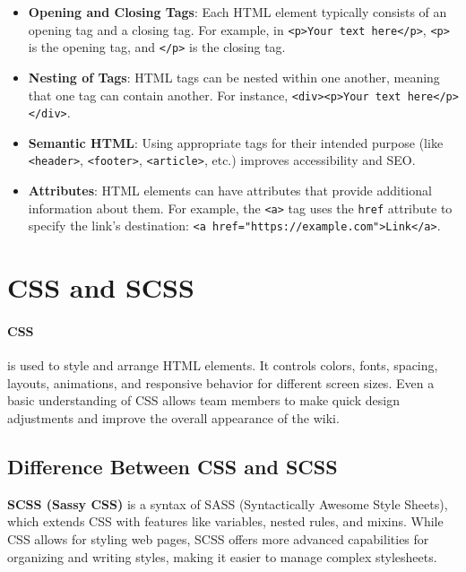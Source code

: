 \begin{itemize}
    \item \textbf{Opening and Closing Tags}: Each HTML element typically consists of an opening tag and a closing tag.
    For example, in \texttt{<p>Your text here</p>}, \texttt{<p>} is the opening tag, and \texttt{</p>} is the closing tag.

    \item \textbf{Nesting of Tags}: HTML tags can be nested within one another, meaning that one tag can contain another.
    For instance, \texttt{<div><p>Your text here</p></div>}.

    \item \textbf{Semantic HTML}: Using appropriate tags for their intended purpose (like \texttt{<header>}, \texttt{<footer>}, \texttt{<article>}, etc.) improves accessibility and SEO\@.

    \item \textbf{Attributes}: HTML elements can have attributes that provide additional information about them.
    For example, the \texttt{<a>} tag uses the \texttt{href} attribute to specify the link's destination:
    \verb|<a href="https://example.com">Link</a>|.
\end{itemize}


\section{CSS and SCSS}\label{sec:css-and-scss} 

\paragraph{CSS} is used to style and arrange HTML elements.
It controls colors, fonts, spacing, layouts, animations, and responsive behavior for different screen sizes.
Even a basic understanding of CSS allows team members to make quick design adjustments and improve the overall appearance of the wiki. \\ \newline

\subsection*{Difference Between CSS and SCSS}

\textbf{SCSS (Sassy CSS)} is a syntax of SASS (Syntactically Awesome Style Sheets), which extends CSS with features like variables, nested rules, and mixins.
While CSS allows for styling web pages, SCSS offers more advanced capabilities for organizing and writing styles, making it easier to manage complex stylesheets.

